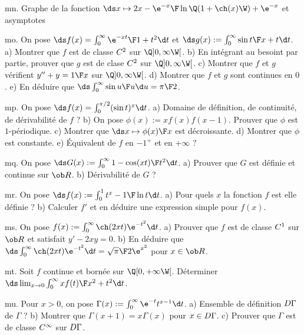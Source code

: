\exo [Level=1,Fight=1,Learn=0,Type=\Exercices,Field=\Fonctions,Origin=] mn. 
Graphe de la fonction $\ds x\mapsto {2x-\e^{-x}\F\ln\Q(1+\ch(x)\W)+\e^{-x}}$ et asymptotes

\exo [Level=2,Fight=2,Learn=2,Type=\Exercices,Field=\FonctionsDéfiniesParUneIntégrale,Origin=] mo. 
On pose $\ds f(x)=\int_0^\infty{\e^{-xt}\F1+t^2}\d t$ et $\ds g(x):=\int_0^\infty{\sin t\F x+t}\d t$. \pn
a) Montrer que $f$ est de classe $\sc C^2$ sur $\Q]0,\infty\W[$. \pn
b) En intégrant au besoint par partie, prouver que $g$ est de clase $\sc C^2$ sur $\Q]0,\infty\W[$. \pn
c) Montrer que $f$ et $g$ vérifient $y''+y={1\F x}$ sur $\Q]0,\infty\W[$. \pn
d) Montrer que $f$ et $g$ sont continues en $0$. \pn
e) En déduire que $\ds\int_0^\infty{\sin u\F u}\d u={\pi\F 2}$. 

\exo [Level=2,Fight=2,Learn=2,Type=\Exercices,Field=\FonctionsDéfiniesParUneIntégrale,Origin=] mp. 
On pose $\ds f(x)=\int_0^{\pi/2}(\sin t)^x\d t$. \pn
a) Domaine de définition, de continuité, de dérivabilité de $f$ ? \pn
b) On pose $\phi(x):=xf(x)f(x-1)$. Prouver que $\phi$ est $1$-périodique. \pn
c) Montrer que $\ds x\mapsto{\phi(x)\F x}$ est décroissante. \pn
d) Montrer que $\phi$ est constante. \pn
e) \'Equivalent de $f$ en $-1^+$ et en $+\infty$ ? 

\exo [Level=2,Fight=1,Learn=2,Type=\Exercices,Field=\FonctionsDéfiniesParUneIntégrale,Origin=] mq. 
On pose $\ds G(x):=\int_0^\infty{1-\cos(xt)\F t^2}\d t$. \pn
a) Prouver que $G$ est définie et continue sur $\ob R$. \pn
b) Dérivabilité de $G$ ?

\exo [Level=2,Fight=1,Learn=2,Type=\Exercices,Field=\FonctionsDéfiniesParUneIntégrale,Origin=] mr. 
On pose $\ds f(x):=\int_0^1{t^x-1\F\ln t}\d t$. \pn
a) Pour quels $x$ la fonction $f$ est elle définie ? \pn
b) Calculer $f'$ et en déduire une expression simple pour $f(x)$. 

\exo [Level=2,Fight=1,Learn=2,Type=\Exercices,Field=\FonctionsDéfiniesParUneIntégrale,Origin=] ms. 
On pose $f(x):=\int_0^\infty\ch(2xt)\e^{-t^2}\d t$. \pn
a) Prouver que $f$ est de classe $\sc C^1$ sur $\ob R$ et satisfait $y'-2xy=0$. \pn
b) En déduire que $\ds \int_0^\infty\ch(2xt)\e^{-t^2}\d t={\sqrt\pi\F 2}\e^{x^2}$ pour $x\in\ob R$. 

\exo [Level=2,Fight=1,Learn=2,Type=\Exercices,Field=\FonctionsDéfiniesParUneIntégrale,Origin=] mt. 
Soit $f$ continue et bornée sur $\Q[0,+\infty\W[$. Déterminer $\ds\lim_{x\to0}\int_0^\infty{xf(t)\F x^2+t^2}\d t$. 

\exo [Level=2,Fight=2,Learn=2,Type=\Exercices,Field=\FonctionsDéfiniesParUneIntégrale,Origin=] mu. 
Pour $x>0$, on pose $\Gamma(x):=\int_0^\infty\e^{-t}t^{x-1}\d t$. \pn
a) Ensemble de définition $\sc D\Gamma$ de $\Gamma$ ? \pn 
b) Montrer que $\Gamma(x+1)=x\Gamma(x)$ pour $x\in\sc D\Gamma$. \pn
c) Prouver que $\Gamma$ est de classe $\sc C^\infty$ sur $\sc D\Gamma$. 


